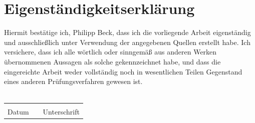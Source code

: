 \documentclass[12pt,twoside,a4paper]{scrbook}
\numberwithin{equation}{chapter}
\theoremstyle{satz}
\theoremstyle{def}
\newcommand{\blankpage}{
	\newpage
	\thispagestyle{empty}
	\mbox{}
	\newpage
}
\begin{document}
\tableofcontents


\blankpage


\blankpage

%
\newpage

\newpage

\newpage



\newpage

\blankpage


\newpage
\nocite{*}


\newpage \blankpage
\thispagestyle{empty}
\section*{Eigenständigkeitserklärung}

Hiermit bestätige ich, Philipp Beck, dass ich die vorliegende Arbeit eigenständig und ausschließlich unter Verwendung der angegebenen Quellen erstellt habe. 
Ich versichere, dass ich alle wörtlich oder sinngemäß aus anderen Werken übernommenen Aussagen als solche gekennzeichnet habe, und dass die eingereichte Arbeit weder vollständig noch in wesentlichen Teilen Gegenstand eines anderen Prüfungsverfahren gewesen ist.\\
\newline\\
\newline
\begin{tabular}{lp{2em}l}
	\hspace{3cm}   && \hspace{3cm} \\\cline{1-1}\cline{2-3}
	Datum     && Unterschrift
\end{tabular}
\vspace{1cm}

\end{document}
